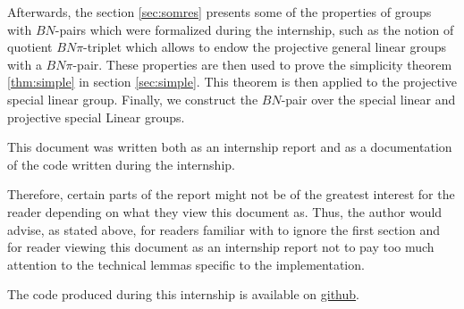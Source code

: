     Afterwards, the section \ref{sec:somres} presents some of the properties of groups with $BN$-pairs which were formalized during the internship, such as the notion of quotient $BN\pi$-triplet which allows to endow the projective general linear groups with a $BN\pi$-pair.
    These properties are then used to prove the simplicity theorem \ref{thm:simple} in section \ref{sec:simple}. This theorem is then applied to the projective special linear group. Finally, we construct the $BN$-pair over the special linear and projective special Linear groups.


 This document was written both as an internship report and as a documentation of the code written during the internship.

 Therefore, certain parts of the report might not be of the greatest interest for the reader depending on what they view this document as. Thus, the author would advise, as stated above, for readers familiar with \Lean to ignore the first section and for reader viewing this document as an internship report not to pay too much attention to the technical lemmas specific to the \Lean implementation.

 The code produced during this internship is available on \href{https://github.com/corent1234/BNpairs/blob/master/report/example.lean}{github}.
